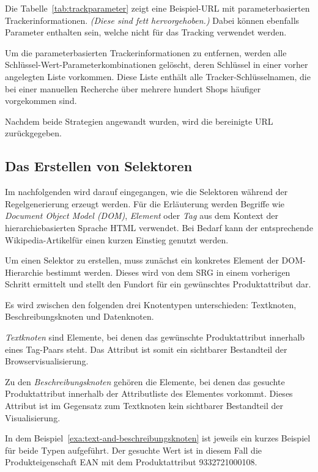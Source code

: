 Die Tabelle~\ref{tab:trackparameter} zeigt eine Beispiel-URL mit parameterbasierten Trackerinformationen.
\textit{(Diese sind fett hervorgehoben.)}
Dabei können ebenfalls Parameter enthalten sein, welche nicht für das Tracking verwendet werden.

Um die parameterbasierten Trackerinformationen zu entfernen, werden alle Schlüssel-Wert-Parameterkombinationen
gelöscht, deren Schlüssel in einer vorher angelegten Liste vorkommen.
Diese Liste enthält alle Tracker-Schlüsselnamen, die bei einer manuellen Recherche über mehrere hundert Shops
häufiger vorgekommen sind.

Nachdem beide Strategien angewandt wurden, wird die bereinigte URL zurückgegeben.

\subsection{Das Erstellen von Selektoren}
\label{subsec:erstellen-von-selektoren}

Im nachfolgenden wird darauf eingegangen, wie die Selektoren während der Regelgenerierung erzeugt werden.
Für die Erläuterung werden Begriffe wie \textit{Document Object Model (DOM)}, \textit{Element} oder \textit{Tag} aus
dem Kontext der hierarchiebasierten Sprache HTML verwendet.
Bei Bedarf kann der entsprechende Wikipedia-Artikel\footnotemark für einen kurzen Einstieg genutzt werden.

Um einen Selektor zu erstellen, muss zunächst ein konkretes Element der DOM-Hierarchie bestimmt werden.
Dieses wird von dem SRG in einem vorherigen Schritt ermittelt und stellt den Fundort für ein gewünschtes
Produktattribut dar.

Es wird zwischen den folgenden drei Knotentypen unterschieden: Textknoten, Beschreibungsknoten und Datenknoten.

\textit{Textknoten} sind Elemente, bei denen das gewünschte Produktattribut innerhalb eines Tag-Paars steht.
Das Attribut ist somit ein sichtbarer Bestandteil der Browservisualisierung.

Zu den \textit{Beschreibungsknoten} gehören die Elemente, bei denen das gesuchte Produktattribut innerhalb der
Attributliste des Elementes vorkommt.
Dieses Attribut ist im Gegensatz zum Textknoten kein sichtbarer Bestandteil der Visualisierung.

In dem Beispiel~\ref{exa:text-and-beschreibungsknoten} ist jeweils ein kurzes Beispiel für beide Typen aufgeführt.
Der gesuchte Wert ist in diesem Fall die Produkteigenschaft EAN mit dem Produktattribut 9332721000108.

